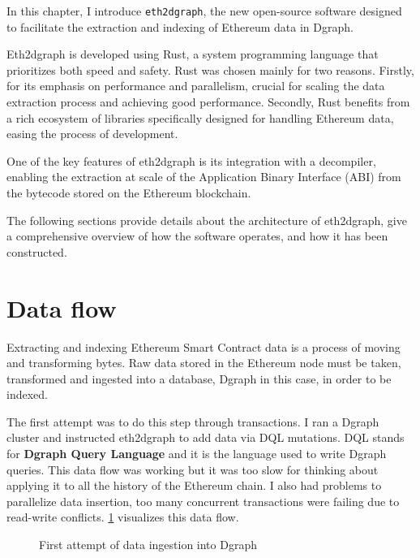 
\noindent In this chapter, I introduce {\tt eth2dgraph}, the new open-source software designed to facilitate the extraction and indexing of Ethereum data in Dgraph.

Eth2dgraph is developed using Rust, a system programming language that prioritizes both speed and safety. Rust was chosen mainly for two reasons. Firstly, for its emphasis on performance and parallelism, crucial for scaling the data extraction process and achieving good performance. Secondly, Rust benefits from a rich ecosystem of libraries specifically designed for handling Ethereum data, easing the process of development.

One of the key features of eth2dgraph is its integration with a decompiler, enabling the extraction at scale of the Application Binary Interface (ABI) from the bytecode stored on the Ethereum blockchain. 

The following sections provide details about the architecture of eth2dgraph, give a comprehensive overview of how the software operates, and how it has been constructed.

\section{Data flow}

Extracting and indexing Ethereum Smart Contract data is a process of moving and transforming bytes. Raw data stored in the Ethereum node must be taken, transformed and ingested into a database, Dgraph in this case, in order to be indexed. 

The first attempt was to do this step through transactions. I ran a Dgraph cluster and instructed eth2dgraph to add data via DQL mutations. DQL stands for \textbf{Dgraph Query Language} and it is the language used to write Dgraph queries. This data flow was working but it was too slow for thinking about applying it to all the history of the Ethereum chain. I also had problems to parallelize data insertion, too many concurrent transactions were failing due to read-write conflicts. \cref{fig:data-flow-1} visualizes this data flow.

\begin{figure}[H]
\centering
{}
\caption[First attempt of data ingestion into Dgraph]{First attempt of data ingestion into Dgraph}
\label{fig:data-flow-1}
\end{figure}

